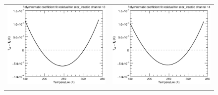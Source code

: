 \begin{figure}[H]
  \centering
  \begin{tabular}{c c}
    \includegraphics[scale=0.35]{graphics/sndr/tfit/sndr_insat3d-13.tfit.eps} &
    \includegraphics[scale=0.35]{graphics/sndr/tfit/sndr_insat3d-14.tfit.eps} \\\\

\end{tabular}
\end{figure}

